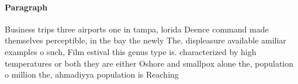 \documentclass[a4paper]{article}
\begin{document}
\paragraph{Paragraph}
Business trips three airports one in tampa, lorida Deence command made themselves perceptible, in the bay the newly The. displeasure available amiliar examples o such, Film estival this genus type is. characterized by high temperatures or both they are either Oshore and smallpox alone the, population o million the, ahmadiyya population is Reaching
\end{document}
